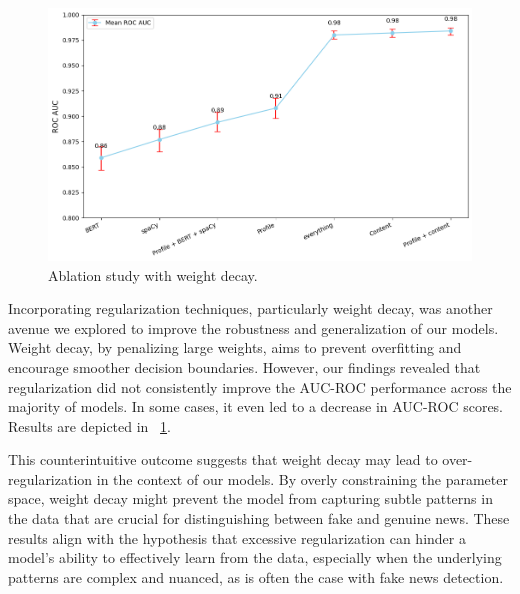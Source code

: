 \documentclass[sigconf,nonacm]{acmart}
\begin{document}
\begin{figure}
    \centering
    \includegraphics[scale=0.35]{roc_weight_decay.png}
    \caption{Ablation study with weight decay.}
    \label{fig:roc_decay}
\end{figure}

Incorporating regularization techniques, particularly weight decay, was another avenue we explored to improve the robustness and generalization of our models. Weight decay, by penalizing large weights, aims to prevent overfitting and encourage smoother decision boundaries. However, our findings revealed that regularization did not consistently improve the AUC-ROC performance across the majority of models. In some cases, it even led to a decrease in AUC-ROC scores. Results are depicted in ~\ref{fig:roc_decay}.

This counterintuitive outcome suggests that weight decay may lead to over-regularization in the context of our models. By overly constraining the parameter space, weight decay might prevent the model from capturing subtle patterns in the data that are crucial for distinguishing between fake and genuine news. These results align with the hypothesis that excessive regularization can hinder a model's ability to effectively learn from the data, especially when the underlying patterns are complex and nuanced, as is often the case with fake news detection.
\end{document}
